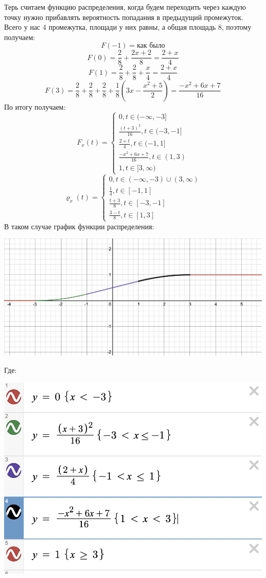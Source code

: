 \documentclass[a4paper,12pt]{article}
\begin{document}
Терь считаем функцию распределения, когда будем переходить через каждую точку нужно прибавлять вероятность попадания в предыдущий промежуток. Всего у нас 4 промежутка, площади у них равны, а общая площадь 8, поэтому получаем:
\[
F(-1) = \text{как было} 
\]
\[
F(0) = \frac28 + \frac{2x+2}{8}  = \frac{2+x}{4}
\]
\[
F(1) = \frac{2}{8} + \frac28 +  \frac{x}{4}= \frac{2+x}{4}
\]
\[
F(3) = \frac28 + \frac28 + \frac28 + \frac18 \left(3x - \frac{x^2+5}{2}\right) = \frac{-x^2 + 6x + 7}{16}
\]
По итогу получаем:
\[
F_x(t) = 
\begin{cases}
0, t \in (-\infty, -3] \\
\frac{(t+3)^2}{16}, t \in (-3, -1] \\
\frac{2+t}{4}, t \in (-1, 1] \\
\frac{-x^2 + 6x + 7}{16}, t \in (1, 3) \\
1, t \in [3, \infty)
\end{cases}
\]
\[
\varrho_x(t) = 
\begin{cases}
0, t \in (-\infty, -3) \cup (3 , \infty) \\
\frac14, t \in [-1, 1] \\
\frac{t+3}{8}, t \in [-3, -1] \\
\frac{3-t}{8}, t \in [1, 3]
\end{cases}
\]
В таком случае график функции распределения:
\begin{center}
\includegraphics[scale=0.4]{3.png}
\end{center}
Где:
\begin{center}
\includegraphics[scale=0.4]{4.png}
\end{center}
\end{document}
